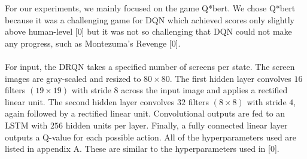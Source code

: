 \documentclass{article}
\begin{document}
For our experiments, we mainly focused on the game Q*bert. We chose Q*bert because
it was a challenging game for DQN which achieved scores only slightly above
human-level [0] but it was not so challenging that DQN could not make any progress,
such as Montezuma's Revenge [0]. \\
\\
For input, the DRQN takes a specified number of screens per state. The screen images
are gray-scaled and resized to $80 \times 80$. The first hidden layer convolves $16$
filters $(19 \times 19)$ with stride $8$ across the input image and applies a rectified
linear unit.  The second hidden layer convolves $32$ filters  $(8 \times 8)$ with
stride $4$, again followed by a rectified linear unit.  Convolutional outputs are
fed to an LSTM with $256$ hidden units per layer.  Finally, a fully connected
linear layer outputs a Q-value for each possible action. All of the hyperparameters
used are listed in appendix A. These are similar to the hyperparameters used in [0]. \\
\end{document}
